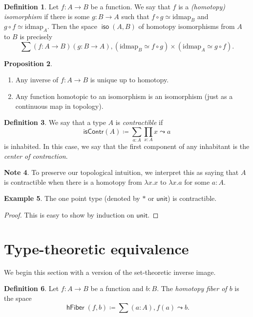 \documentclass[10pt,letterpaper,cm]{nupset}
\theoremstyle{definition}
\newtheorem{definition}{Definition}[subsection]
\newtheorem{exmp}[definition]{Example}
\newtheorem{note}[definition]{Note}
\theoremstyle{theorem}
\newtheorem{prop}[definition]{Proposition}
\theoremstyle{remark}
\newcommand{\1}{\mathbf{1}}
\newcommand{\0}{\vec 0}
\DeclareMathOperator{\iso}{\mathsf{iso}}
\DeclareMathOperator{\hfiber}{\mathsf{hFiber}}
\begin{document}
\begin{definition}
Let $f: A \to B$ be a function. We say that $f$ is a \textit{(homotopy) isomorphism} if there is some $g:  B \to A$ such that $f \circ g \simeq \text{idmap}_B$ and $g\circ f \simeq \text{idmap}_A$. Then the space $\iso(A,B)$ of homotopy isomorphisms from $A$ to $B$ is precisely $$\sum(f:A\to B)(g:B \to A), (\text{idmap}_B \simeq f\circ g) \times  (\text{idmap}_A \simeq g\circ f).$$
\end{definition}

\begin{prop} $ $
\begin{enumerate}
\item Any inverse of $f: A \to B$ is unique up to homotopy. 
\item  Any function homotopic to an isomorphism is an isomorphism (just as a continuous map in topology).
\end{enumerate}
\end{prop}

\begin{definition}
We say that a type $A$ is \textit{contractible} if 
\[
\mathsf{isContr}(A)\coloneqq \sum_{a:A}\prod_{x:A}x \leadsto a
\] is inhabited. In this case, we say that the first component of any inhabitant is the \textit{center of contraction}.
\end{definition}
\begin{note}
To preserve our topological intuition, we interpret this as saying that $A$ is contractible when there is a homotopy from $\lambda x.x$ to $\lambda x.a$ for some $a:A$.
\end{note}

\begin{exmp}
The one point type (denoted by $\ast$ or $\mathsf{unit}$) is contractible.
\end{exmp}
\begin{proof}
This is easy to show by induction on $\mathsf{unit}$.
\end{proof}

\section{Type-theoretic equivalence}

We begin this section with a version of the set-theoretic inverse image.

\begin{definition}
Let $f: A \to B$ be a function and $b: B$. The \textit{homotopy fiber of $b$} is the space $$\hfiber(f,b) \coloneqq \sum(a:A), f(a) \leadsto b .$$
\end{definition}
\end{document}
